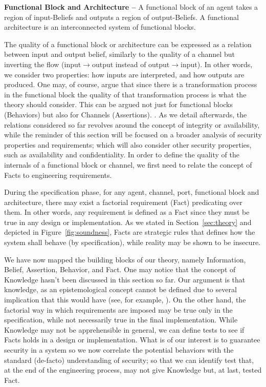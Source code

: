 \begin{definition}{\bf Functional Block and Architecture --}\label{def:funblock}
	A functional block of an agent 
	takes a region of input-Beliefs and outputs a region of output-Beliefs. 
	A functional architecture is an interconnected system of functional blocks.
\end{definition}
The quality of a functional block or architecture can be expressed as a
relation between input and output belief, similarly to the quality of a channel
but inverting the flow (input$\rightarrow$output instead of
output$\rightarrow$input). In other words, we consider two properties:
how inputs are interpreted, and how outputs are produced.
One may, of course, argue that since there is a
transformation process in the functional block the quality of that
transformation process is what the theory should consider. This can
be argued not just for functional blocks (Behaviors) but also for Channels
(Assertions). .
As we detail afterwards, the relations considered so
far revolves around the concept of integrity or availability, while the reminder of this section 
will be focused on a broader analysis of security properties and requirements;
which will also consider other security properties, such as availability and
confidentiality.  In order to define the quality of the internals of a functional block or channel, we first
need to relate the concept of Facts to engineering requirements.

During the specification phase, for any agent, channel, port, functional block
and architecture, there may exist a factorial requirement (Fact) predicating over them.
In other words, any requirement is defined as a Fact since they must be true in
any design or implementation. As we stated in Section~\ref{sec:theory} and depicted in
Figure~\ref{fig:soundness}, Facts are strategic rules that defines how
the system shall behave (by specification), while reality may be shown to
be insecure.

We have now mapped the building blocks of our theory, namely Information,
Belief, Assertion, Behavior, and Fact. One may notice that the concept of
Knowledge hasn't been discussed in this section so far. Our argument is that
knowledge, as an epistemological concept cannot be defined due to several
implication that this would have (see, for example,
\autocite{Empiricus1990Pyrrhonism}). On the other hand, the factorial way in
which requirements are imposed may be true only in the specification, while not
necessarily true in the final implementation. While Knowledge may not be
apprehensible in general, we can define tests to see if Facts holds in a
design or implementation. What is of our interest is to guarantee security in a
system so we now correlate the potential behaviors with the standard (de-facto)
understanding of security; so that we can identify test that, at the end of the
engineering process, may not give Knowledge but, at last, tested Fact.

